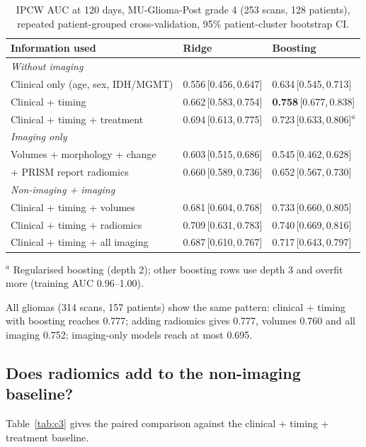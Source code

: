 \documentclass[11pt,a4paper]{article}
\newcommand{\ci}[2]{\,[#1,\,#2]}
\begin{document}
\begin{table}[h]
\centering
\caption{IPCW AUC at 120 days, MU-Glioma-Post grade 4 (253 scans, 128 patients), repeated patient-grouped
cross-validation, 95\% patient-cluster bootstrap CI.}
\label{tab:main}
\small
\begin{tabular}{lll}
\toprule
Information used & Ridge & Boosting \\
\midrule
\multicolumn{3}{l}{\emph{Without imaging}} \\
Clinical only (age, sex, IDH/MGMT) & 0.556\ci{0.456}{0.647} & 0.634\ci{0.545}{0.713} \\
Clinical + timing & 0.662\ci{0.583}{0.754} & \textbf{0.758}\ci{0.677}{0.838} \\
Clinical + timing + treatment & 0.694\ci{0.613}{0.775} & 0.723\ci{0.633}{0.806}$^{a}$ \\
\midrule
\multicolumn{3}{l}{\emph{Imaging only}} \\
Volumes + morphology + change & 0.603\ci{0.515}{0.686} & 0.545\ci{0.462}{0.628} \\
\quad + PRISM report radiomics & 0.660\ci{0.589}{0.736} & 0.652\ci{0.567}{0.730} \\
\midrule
\multicolumn{3}{l}{\emph{Non-imaging + imaging}} \\
Clinical + timing + volumes & 0.681\ci{0.604}{0.768} & 0.733\ci{0.660}{0.805} \\
Clinical + timing + radiomics & 0.709\ci{0.631}{0.783} & 0.740\ci{0.669}{0.816} \\
Clinical + timing + all imaging & 0.687\ci{0.610}{0.767} & 0.717\ci{0.643}{0.797} \\
\bottomrule
\end{tabular}

\vspace{0.3em}
\footnotesize $^{a}$ Regularised boosting (depth 2); other boosting rows use depth 3 and overfit more
(training AUC 0.96--1.00).
\end{table}

All gliomas (314 scans, 157 patients) show the same pattern: clinical + timing with boosting reaches 0.777; adding
radiomics gives 0.777, volumes 0.760 and all imaging 0.752; imaging-only models reach at most 0.695.

\subsection{Does radiomics add to the non-imaging baseline?}
Table~\ref{tab:c3} gives the paired comparison against the clinical + timing + treatment baseline.
\end{document}
